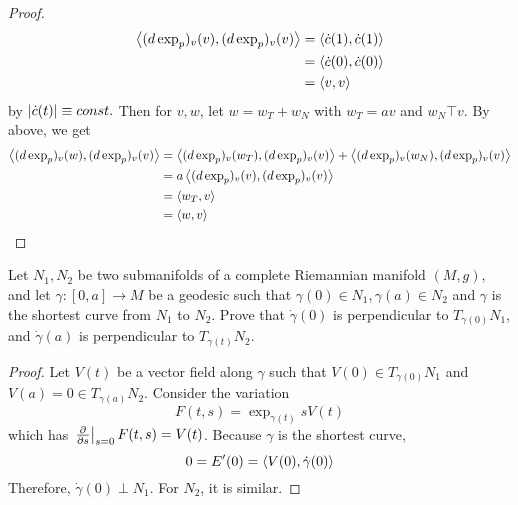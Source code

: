 \begin{enumerate}[label=\arabic{*}.]
\begin{proof}
\begin{equation*}
			\begin{aligned}
				\left\langle (d\exp_p)_v(v),(d\exp_p)_v(v) \right\rangle &= \left\langle \dot{c}(1),\dot{c}(1) \right\rangle \\
				&= \left\langle \dot{c}(0),\dot{c}(0) \right\rangle \\
				&= \left\langle v,v \right\rangle
			\end{aligned}
		\end{equation*}
		by $\left\lvert\dot{c}(t)\right\lvert \equiv const.$ Then for $v,w$, let $w = w_T + w_N$ with $w_T = av$ and $w_N \top v$. By above, we get
		\begin{equation*}
			\begin{aligned}
				\left\langle (d\exp_p)_v(w),(d\exp_p)_v(v) \right\rangle &= \left\langle (d\exp_p)_v(w_T),(d\exp_p)_v(v) \right\rangle +\left\langle (d\exp_p)_v(w_N),(d\exp_p)_v(v) \right\rangle \\
				&= a\left\langle (d\exp_p)_v(v),(d\exp_p)_v(v) \right\rangle \\
				&= \left\langle w_T,v \right\rangle \\
				&= \left\langle w,v \right\rangle 
			\end{aligned}
		\end{equation*}
	\end{proof}

	\begin{lem}\label{lem:shortperp}
		Let $N_1, N_2$ be two submanifolds of a complete Riemannian manifold $(M, g)$, and let $\gamma:[0, a] \rightarrow M$ be a geodesic such that $\gamma(0) \in N_1, \gamma(a) \in N_2$ and $\gamma$ is the shortest curve from $N_1$ to $N_2$. Prove that $\dot{\gamma}(0)$ is perpendicular to $T_{\gamma(0)} N_1$, and $\dot{\gamma}(a)$ is perpendicular to $T_{\gamma(t)} N_2$.
	\end{lem}
	\begin{proof}
		Let $V(t)$ be a vector field along $\gamma$ such that $V(0) \in T_{\gamma(0)}N_1$ and $V(a) = 0 \in T_{\gamma(a)}N_2$. Consider the variation
		\begin{equation*}
			F(t,s) = \exp_{\gamma(t)}sV(t)
		\end{equation*}
		which has $\left.\frac{\partial}{\partial s}\right\lvert_{s=0} F(t,s) = V(t)$. Because $\gamma$ is the shortest curve,
		\begin{equation*}
			0 = E^\prime(0) = \left\langle V(0),\dot{\gamma}(0) \right\rangle
		\end{equation*}
		Therefore, $\dot{\gamma}(0) \perp N_1$. For $N_2$, it is similar.
	\end{proof}


\end{enumerate}
